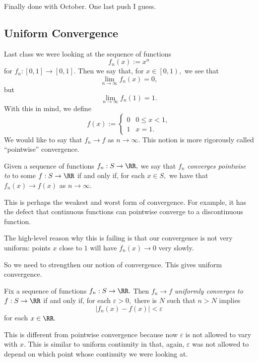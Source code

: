 












Finally done with October. One last push I guess.

\subsection{Uniform Convergence}
Last class we were looking at the sequence of functions
\[f_n(x):=x^n\]
for $f_n:[0,1]\to[0,1].$ Then we say that, for $x\in\left[0,1\right),$ we see that
\[\lim_{n\to\infty}f_n(x)=0,\]
but
\[\lim_{n\to\infty}f_n(1)=1.\]
With this in mind, we define
\[f(x):=\begin{cases}
	0 & 0\le x<1, \\
	1 & x=1.
\end{cases}\]
We would like to say that $f_n\to f$ as $n\to\infty.$ This notion is more rigorously called ``pointwise'' convergence.
\begin{definition}
	Given a sequence of functions $f_n:S\to\RR,$ we say that $f_n$ \textit{converges pointwise to} to some $f:S\to\RR$ if and only if, for each $x\in S,$ we have that $f_n(x)\to f(x)$ as $n\to\infty.$
\end{definition}
This is perhaps the weakest and worst form of convergence. For example, it has the defect that continuous functions can pointwise converge to a discontinuous function.
\begin{remark}
	The high-level reason why this is failing is that our convergence is not very uniform: points $x$ close to $1$ will have $f_n(x)\to0$ very slowly.
\end{remark}
So we need to strengthen our notion of convergence. This gives uniform convergence.
\begin{definition}
	Fix a sequence of functions $f_n:S\to\RR.$ Then $f_n\to f$ \textit{uniformly converges to} $f:S\to\RR$ if and only if, for each $\varepsilon>0,$ there is $N$ such that $n>N$ implies
	\[|f_n(x)-f(x)|<\varepsilon\]
	for each $x\in\RR.$
\end{definition}
This is different from pointwise convergence because now $\varepsilon$ is not allowed to vary with $x.$ This is similar to uniform continuity in that, again, $\varepsilon$ was not allowed to depend on which point whose continuity we were looking at.

